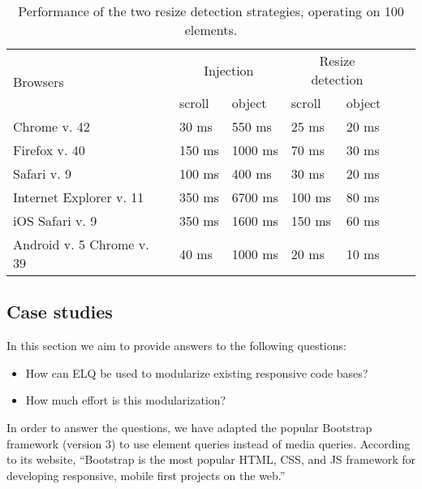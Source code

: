 \documentclass{llncs}
\newcommand{\elq}{ELQ}
\begin{document}
    \begin{table}[ht]\center
      \tiny
      \begin{tabular}[t]{ l l l l l l l }
        \multirow{2}{*}{Browsers} & \multicolumn{2}{c}{Injection} & \multicolumn{2}{c}{Resize detection} \\
        & scroll & object & scroll & object \\
        \hline
        Chrome v. 42                & 30 ms   & 550 ms    & 25 ms    & 20 ms  \\
        Firefox v. 40               & 150 ms  & 1000 ms   & 70 ms    & 30 ms  \\
        Safari v. 9                 & 100 ms  & 400 ms    & 30 ms    & 20 ms  \\
        Internet Explorer v. 11     & 350 ms  & 6700 ms   & 100 ms   & 80 ms  \\
        iOS Safari v. 9             & 350 ms  & 1600 ms   & 150 ms   & 60 ms  \\
        Android v. 5 Chrome v. 39   & 40 ms   & 1000 ms  & 20 ms     & 10 ms  \\
      \end{tabular}
      \vspace{.5cm}
      \caption{Performance of the two resize detection strategies, operating on 100 elements.}
      \label{table:erd-layout-engines}
    \end{table}
    \vspace{-1cm}
  \subsection{Case studies}
    In this section we aim to provide answers to the following questions:
    \begin{itemize}
      \item How can \elq{} be used to modularize existing responsive code bases?
      \item How much effort is this modularization?
    \end{itemize}

    \noindent
    In order to answer the questions, we have adapted the popular Bootstrap framework (version 3) to use element queries instead of media queries.
    According to its website, ``Bootstrap is the most popular HTML, CSS, and JS framework for developing responsive, mobile first projects on the web.''~\cite{bootstrap}
\end{document}

